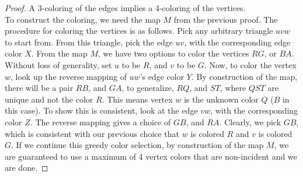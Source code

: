 \documentclass[a4paper]{article}
\begin{document}
\begin{proof} A 3-coloring of the edges implies a 4-coloring of the vertices. \\

    To construct the coloring, we need the map $M$ from the previous proof. The procedure for coloring the vertices is as follows. Pick any arbitrary triangle $uvw$ to start from. From this triangle, pick the edge $uv$, with the corresponding edge color $X$. From the map $M$, we have two options to color the vertices $RG$, or $BA$. Without loss of generality, set $u$ to be $R$, and $v$ to be $G$. Now, to color the vertex $w$, look up the reverse mapping of $uw$'s edge color $Y$. By construction of the map, there will be a pair $RB$, and $GA$, to generalize, $RQ$, and $ST$, where $QST$ are unique and not the color $R$. This means vertex $w$ is the unknown color $Q$ ($B$ in this case). To show this is consistent, look at the edge $vw$, with the corresponding color $Z$. The reverse mapping gives a choice of $GB$, and $RA$. Clearly, we pick $GB$, which is consistent with our previous choice that $w$ is colored $R$ and $v$ is colored $G$. If we continue this greedy color selection, by construction of the map $M$, we are guaranteed to use a maximum of 4 vertex colors that are non-incident and we are done.

\end{proof}
\end{document}
